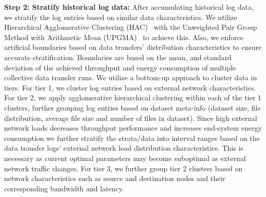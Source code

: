 \documentclass[conference]{IEEEtran}
\begin{document}
\textbf{Step 2: Stratify historical log data:}
After accumulating historical log data, we stratify the log entries based on similar data characteristics. We utilize Hierarchical Agglomerative Clustering (HAC)~\cite{murtagh2014ward} with the Unweighted Pair Group Method with Arithmetic Mean (UPGMA)~\cite{gronau2007optimal} to achieve this. Also, we enforce artificial boundaries based on data transfers' distribution characteristics to ensure accurate stratification. Boundaries are based on the mean, and standard deviation of the achieved throughput and energy consumption of multiple collective data transfer runs. 
We utilize a bottom-up approach to cluster data in tiers. For tier 1, we cluster log entries based on external network characteristics. For tier 2, we apply agglomerative hierarchical clustering within each of the tier 1 clusters, further grouping log entries based on dataset meta-info (dataset size, file distribution, average file size and number of files in dataset). Since high external network loads decreases throughput performance and increases end-system energy consumption we further stratify the strata/data into interval ranges based on the data transfer logs' external network load distribution characteristics. This is necessary as current optimal parameters may become suboptimal as external network traffic changes. 
For tier 3, we further group tier 2 clusters based on network characteristics such as source and destination nodes and their corresponding bandwidth and latency.
\end{document}
